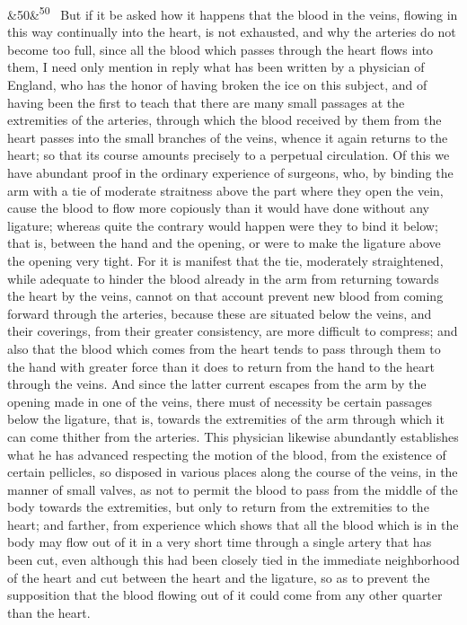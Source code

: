 \documentclass[12pt]{article}
\newcommand{\para}[1][]{\par\noindent\ifx&#1&\else\textsuperscript{\footnotesize #1}~\fi}
\begin{document}
\para[50] But if it be asked how it happens that the blood in the veins, flowing in this way continually into the heart, is not exhausted, and why the arteries do not become too full, since all the blood which passes through the heart flows into them, I need only mention in reply what has been written by a physician of England, who has the honor of having broken the ice on this subject, and of having been the first to teach that there are many small passages at the extremities of the arteries, through which the blood received by them from the heart passes into the small branches of the veins, whence it again returns to the heart; so that its course amounts precisely to a perpetual circulation. Of this we have abundant proof in the ordinary experience of surgeons, who, by binding the arm with a tie of moderate straitness above the part where they open the vein, cause the blood to flow more copiously than it would have done without any ligature; whereas quite the contrary would happen were they to bind it below; that is, between the hand and the opening, or were to make the ligature above the opening very tight. For it is manifest that the tie, moderately straightened, while adequate to hinder the blood already in the arm from returning towards the heart by the veins, cannot on that account prevent new blood from coming forward through the arteries, because these are situated below the veins, and their coverings, from their greater consistency, are more difficult to compress; and also that the blood which comes from the heart tends to pass through them to the hand with greater force than it does to return from the hand to the heart through the veins. And since the latter current escapes from the arm by the opening made in one of the veins, there must of necessity be certain passages below the ligature, that is, towards the extremities of the arm through which it can come thither from the arteries. This physician likewise abundantly establishes what he has advanced respecting the motion of the blood, from the existence of certain pellicles, so disposed in various places along the course of the veins, in the manner of small valves, as not to permit the blood to pass from the middle of the body towards the extremities, but only to return from the extremities to the heart; and farther, from experience which shows that all the blood which is in the body may flow out of it in a very short time through a single artery that has been cut, even although this had been closely tied in the immediate neighborhood of the heart and cut between the heart and the ligature, so as to prevent the supposition that the blood flowing out of it could come from any other quarter than the heart.
\end{document}
